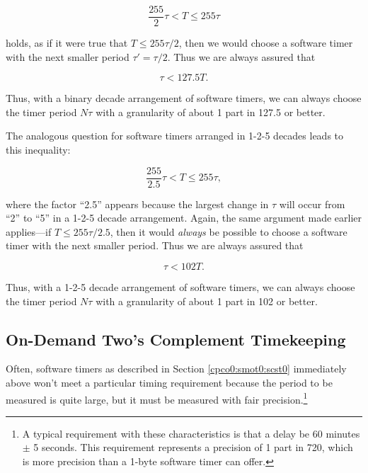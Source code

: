 \begin{equation}
\label{eq:cpco0:smot0:scst0:02}
\frac{255}{2} \tau < T \leq 255 \tau
\end{equation}

\noindent{}holds, as if it were true that $T \leq 255 \tau /2$, 
then we would choose
a software timer with the next smaller period $\tau ' = \tau / 2$.
Thus we are always assured that

\begin{equation}
\label{eq:cpco0:smot0:scst0:03}
\tau < 127.5 T .
\end{equation}

\noindent{}Thus, with a binary decade arrangement of software timers, we
can always choose the timer period $N \tau$ with a granularity of about
1 part in 127.5 or better.

The analogous question for software timers arranged in 1-2-5 decades
leads to this inequality:

\begin{equation}
\label{eq:cpco0:smot0:scst0:04}
\frac{255}{2.5} \tau < T \leq 255 \tau ,
\end{equation}

\noindent{}where the factor ``2.5'' appears because the largest
change in $\tau$ will occur from ``2'' to ``5'' in a 1-2-5 decade
arrangement.  Again, the same argument made earlier 
applies---if $T \leq 255 \tau / 2.5$, then it would \emph{always}
be possible to choose a software timer with the next smaller period.
Thus we are always assured that

\begin{equation}
\label{eq:cpco0:smot0:scst0:05}
\tau < 102 T .
\end{equation}

\noindent{}Thus, with a 1-2-5 decade arrangement of software timers, we
can always choose the timer period $N \tau$ with a granularity of about
1 part in 102 or better.


\subsection{On-Demand Two's Complement Timekeeping}
\label{cpco0:smot0:sodt0}

Often, software timers as described in Section \ref{cpco0:smot0:scst0}
immediately above won't meet a particular timing requirement because
the period to be measured is quite large, but it must be measured with
fair precision.\footnote{A typical requirement with these characteristics
is that a delay be 60 minutes $\pm$ 5 seconds.  This requirement
represents a precision of 1 part in 720, which is more precision
than a 1-byte software timer can offer.}  

